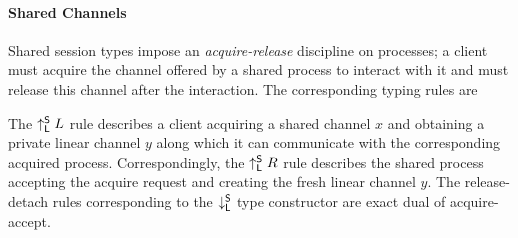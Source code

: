 \paragraph*{\textbf{Shared Channels}}
Shared session types impose an \emph{acquire-release} discipline on processes; 
a client must acquire the channel offered by a shared process to interact with it
and must release this channel after the interaction.
The corresponding typing rules are
The $\uparrow^{\mathsf{S}}_{\mathsf{L}} L$ rule describes a client acquiring a shared channel $x$
and obtaining a private linear channel $y$ along which it can communicate
with the corresponding acquired process.
Correspondingly, the $\uparrow^{\mathsf{S}}_{\mathsf{L}} R$ rule describes the shared process
accepting the acquire request and creating the fresh linear channel $y$.
The release-detach rules corresponding to the $\downarrow^{\mathsf{S}}_{\mathsf{L}}$ type constructor
are exact dual of acquire-accept.
